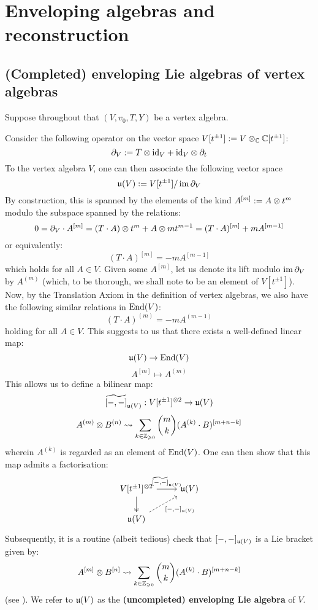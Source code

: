 \section{Enveloping algebras and reconstruction}
    \subsection{(Completed) enveloping Lie algebras of vertex algebras}
        Suppose throughout that $(V, v_0, T, Y)$ be a vertex algebra.
    
        Consider the following operator on the vector space $V[t^{\pm 1}] := V \tensor_{\bbC} \bbC[t^{\pm 1}]$:
            $$\del_V := T \tensor \id_V + \id_V \tensor \del_t$$
        To the vertex algebra $V$, one can then associate the following vector space
            $$\mathfrak{u}(V) := V[t^{\pm 1}]/\operatorname{im} \partial_V$$
        By construction, this is spanned by the elements of the kind $A^{[m]} := A \tensor t^m$ modulo the subspace spanned by the relations:
            $$0 = \del_V \cdot A^{[m]} = (T \cdot A) \tensor t^m + A \tensor m t^{m - 1} = (T \cdot A)^{[m]} + m A^{[m - 1]}$$
        or equivalently:
            $$(T \cdot A)^{[m]} = -m A^{[m - 1]}$$
        which holds for all $A \in V$. Given some $A^{[m]}$, let us denote its lift modulo $\operatorname{im} \partial_V$ by $A^{(m)}$ (which, to be thorough, we shall note to be an element of $V[t^{\pm 1}]$). Now, by the Translation Axiom in the definition of vertex algebras, we also have the following similar relations in $\mathrm{End}(V)$:
            $$(T \cdot A)^{(m)} = -m A^{(m - 1)}$$
        holding for all $A \in V$. This suggests to us that there exists a well-defined linear map:
            $$\mathfrak{u}(V) \to \mathrm{End}(V)$$
            $$A^{[m]} \mapsto A^{(m)}$$
        This allows us to define a bilinear map:
            $$\widetilde{[-, -]}_{\fraku(V)}: V[t^{\pm 1}]^{\tensor 2} \to \fraku(V)$$
            $$A^{(m)} \tensor B^{(n)} \mapsto \sum_{k \in \Z_{\geq 0}} \binom{m}{k} (A^{(k)} \cdot B)^{[m + n - k]}$$
        wherein $A^{(k)}$ is regarded as an element of $\mathrm{End}(V)$. One can then show that this map admits a factorisation:
            $$
                \begin{tikzcd}
                {V[t^{\pm 1}]^{\tensor 2}} & {\fraku(V)} \\
                {\fraku(V)}
                \arrow["{\widetilde{[-, -]}_{\fraku(V)}}", from=1-1, to=1-2]
                \arrow[two heads, from=1-1, to=2-1]
                \arrow["{[-, -]_{\fraku(V)}}"', dashed, from=2-1, to=1-2]
                \end{tikzcd}
            $$
        Subsequently, it is a routine (albeit tedious) check that $[-, -]_{\mathfrak{u}(V)}$ is a Lie bracket given by:
            $$A^{[m]} \tensor B^{[n]} \mapsto \sum_{k \in \Z_{\geq 0}} \binom{m}{k} (A^{(k)} \cdot B)^{[m + n - k]}$$
        (see \cite[Theorem 4.1.2]{frenkel_ben_zvi_vertex_algebras_and_algebraic_curves}). We refer to $\mathfrak{u}(V)$ as the \textbf{(uncompleted) enveloping Lie algebra} of $V$.

